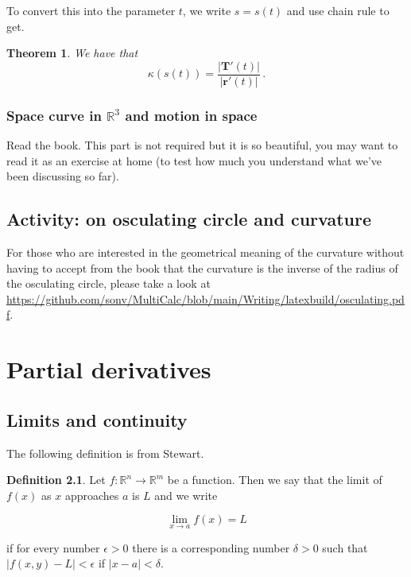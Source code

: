 \documentclass[
]{book}
\newtheorem{theorem}{Theorem}[chapter]
\theoremstyle{definition}
\newtheorem{definition}{Definition}[chapter]
\theoremstyle{definition}
\theoremstyle{definition}
\theoremstyle{definition}
\theoremstyle{remark}
\begin{document}
To convert this into the parameter \(t\), we write \(s= s(t)\) and use chain rule
to get.

\begin{theorem}
We have that
\begin{equation*}
    \kappa(s(t)) =  \frac{|\mathbf{T}'(t)|}{|\mathbf{r}'(t)|}   \,.
\end{equation*}
\end{theorem}

\hypertarget{space-curve-in-mathbbr3-and-motion-in-space}{%
\subsection{\texorpdfstring{Space curve in \(\mathbb{R}^3\) and motion in space}{Space curve in \textbackslash mathbb\{R\}\^{}3 and motion in space}}\label{space-curve-in-mathbbr3-and-motion-in-space}}

Read the book. This part is not required but it is so beautiful, you may want to read it
as an exercise at home (to test how much you understand what we've been discussing so far).

\hypertarget{activity-on-osculating-circle-and-curvature}{%
\section{Activity: on osculating circle and curvature}\label{activity-on-osculating-circle-and-curvature}}

For those who are interested in the geometrical meaning of the curvature without having
to accept from the book that the curvature is the inverse of the radius of the osculating circle,
please take a look at \url{https://github.com/sonv/MultiCalc/blob/main/Writing/latexbuild/osculating.pdf}.

\newpage

\hypertarget{partial-derivatives}{%
\chapter{Partial derivatives}\label{partial-derivatives}}

\hypertarget{limits-and-continuity}{%
\section{Limits and continuity}\label{limits-and-continuity}}

The following definition is from Stewart.

\begin{definition}
Let \(f: \mathbb{R}^n \to \mathbb{R}^m\) be a function. Then we say that the limit of \(f(x)\) as \(x\) approaches \(a\) is \(L\) and we write

\[\lim_{x \to a} f(x) = L\]

if for every number \(\epsilon > 0\) there is a corresponding number \(\delta > 0\) such that
\(|f(x,y) - L| < \epsilon\)
if \(| x - a| < \delta\).
\end{definition}
\end{document}
